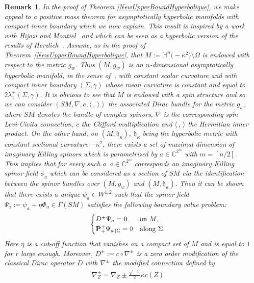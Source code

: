 \documentclass[10pt,a4paper]{amsart}
\numberwithin{equation}{section}
\newtheorem{Remark}[Theorem]{Remark}
\def\Paps{{\bf P}_+}
\begin{document}
\begin{Remark}\label{PMT-HyperbolicBoundary}
In the proof of Theorem \ref{NewUpperBoundHyperbolique}, we make appeal to a positive mass theorem for asymptotically hyperbolic manifolds with compact inner boundary which we now explain. This result is inspired by a work with Hijazi and Montiel~\cite{HijaziMontielRaulot4} and which can be seen as a hyperbolic version of the results of Herzlich~\cite{Herzlich1,Herzlich2}. Assume, as in the proof of Theorem~\ref{NewUpperBoundHyperbolique}, that $M:=\mathbb{H}^n\bigl(-\kappa^2\bigr)\setminus\Omega$ is endowed with respect to the metric $g_w$. Thus $(M,g_w)$ is an $n$-dimensional asymptotically hyperbolic manifold, in the sense of~\cite{AnderssonDahl1}, with constant scalar curvature and with compact inner boundary $(\Sigma,\gamma)$ whose mean curvature is constant and equal to $2\lambda^+_1(\Sigma,\gamma)$. It is obvious to see that $M$ is endowed with a spin structure and so we can consider $(SM,\nabla,c,\langle \,,\,\rangle )$ the associated Dirac bundle for the metric $g_w$, where $SM$ denotes the bundle of complex spinors, $\nabla$ is the corresponding spin Levi-Civita connection, $c$ the Clifford multiplication and $\langle \,,\,\rangle $ the Hermitian inner product.
On the other hand, on $(M,\mathfrak{h}_\kappa)$, $\mathfrak{h}_\kappa$ being the hyperbolic metric with constant sectional curvature $-\kappa^2$, there exists a set of maximal dimension of imaginary Killing spinors which is parametrized by $a\in\mathbb{C}^{2^m}$ with $m=[n/2]$. This implies that for every such a~$a\in\mathbb{C}^{2^m}$ corresponds an imaginary Killing spinor field $\phi_a$ which can be considered as a section of $SM$ via the identification between the spinor bundles over $(M,g_w)$ and $(M,\mathfrak{h}_\kappa)$. Then it can be shown that there exists a unique $\psi_a\in W^{1,2}$ such that the spinor field $\Psi_a:=\psi_a+\eta\Phi_a\in\Gamma(SM)$ satisfies the following boundary value problem:
\[
\begin{cases}
D^+\Psi_a=0 & {\rm on} \ M,\nonumber\\
\Paps^+\Psi_{a\,|\Sigma}=0 & {\rm along} \ \Sigma\nonumber.
\end{cases}
\]
Here $\eta$ is a cut-off function that vanishes on a compact set of $M$ and is equal to $1$ for $r$ large enough. Moreover, $D^\pm:=c\circ\nabla^\pm$ is a zero order modification of the classical Dirac operator $D$ with $\nabla^\pm$ the modified connection defined by
\begin{gather*}
\nabla^\pm_Z=\nabla_Z\pm\frac{\sqrt{-1}}{2}\kappa c(Z)

\end{gather*}
\end{Remark}
\end{document}
